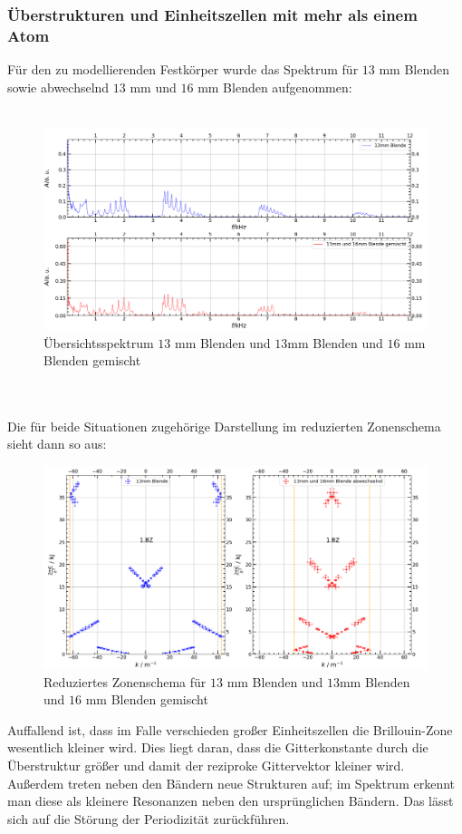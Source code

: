 \documentclass[german,  %
parskip=full,  %
]{scrartcl}
\begin{document}
\subsubsection{Überstrukturen und Einheitszellen mit mehr als einem Atom}
Für den zu modellierenden Festkörper wurde das Spektrum für $13$ mm Blenden sowie abwechselnd $13$ mm und $16$ mm Blenden aufgenommen:
\\\\
\begin{figure}[h!]
\centering
\includegraphics[width=\textwidth]{4631_Uebersichtsspektren.png}
\caption{Übersichtsspektrum $13$ mm Blenden und $13$mm Blenden und $16$ mm Blenden gemischt}
\end{figure}
\\\\
Die für beide Situationen zugehörige Darstellung im reduzierten Zonenschema sieht dann so aus:
\newpage
\begin{figure}[h!]
\centering
\includegraphics[width=\textwidth]{4631_reduziertes_Zonenschema.png}
\caption{Reduziertes Zonenschema für  $13$ mm Blenden und $13$mm Blenden und $16$ mm Blenden gemischt}
\end{figure}
Auffallend ist, dass im Falle verschieden großer Einheitszellen die Brillouin-Zone wesentlich kleiner wird. Dies liegt daran, dass die Gitterkonstante durch die Überstruktur größer und damit der reziproke Gittervektor kleiner wird. Außerdem treten neben den Bändern neue Strukturen auf; im Spektrum erkennt man diese als kleinere Resonanzen neben den ursprünglichen Bändern. Das lässt sich auf die Störung der Periodizität zurückführen. 
\end{document}
